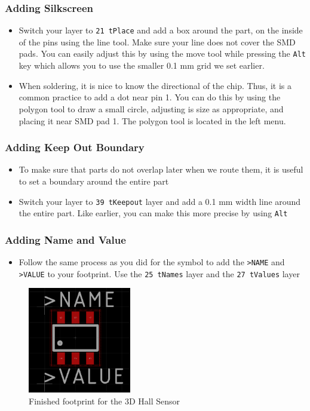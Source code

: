 \documentclass{article}
\begin{document}
\subsubsection{Adding Silkscreen}
\begin{itemize}
    \item Switch your layer to \texttt{21 tPlace} and add a box around the part, on the inside of the pins using the line tool. Make sure your line does not cover the SMD pads. You can easily adjust this by using the move tool while pressing the \texttt{Alt} key which allows you to use the smaller 0.1 mm grid we set earlier. 
    \item When soldering, it is nice to know the directional of the chip. Thus, it is a common practice to add a dot near pin 1. You can do this by using the polygon tool to draw a small circle, adjusting is size as appropriate, and placing it near SMD pad 1. The polygon tool is located in the left menu. 
\end{itemize}
\subsubsection{Adding Keep Out Boundary}
\begin{itemize}
    \item To make sure that parts do not overlap later when we route them, it is useful to set a boundary around the entire part
    \item Switch your layer to \texttt{39 tKeepout} layer and add a 0.1 mm width line around the entire part. Like earlier, you can make this more precise by using \texttt{Alt}
\end{itemize}
\subsubsection{Adding Name and Value}
\begin{itemize}
    \item Follow the same process as you did for the symbol to add the \texttt{>NAME} and \texttt{>VALUE} to your footprint. Use the \texttt{25 tNames} layer and the \texttt{27 tValues} layer
\end{itemize}
\begin{figure}[H]
    \center
	\includegraphics[width=0.4\textwidth, keepaspectratio]{images/footprint.png}
	\caption{Finished footprint for the 3D Hall Sensor}
	\label{fig:footprint}
\end{figure}
\end{document}
